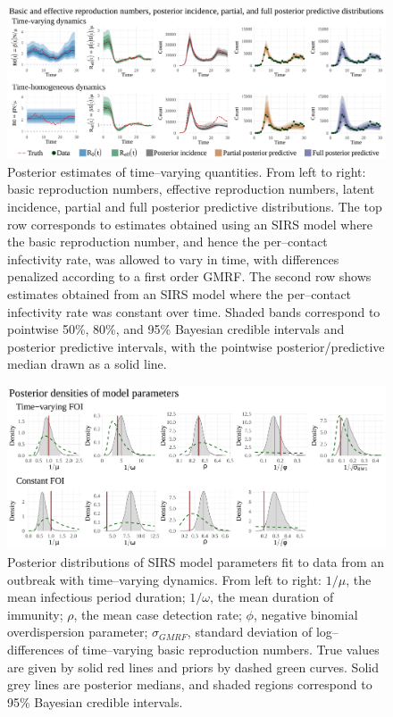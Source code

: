 \begin{figure}
	\centering
	\includegraphics[width=\linewidth]{figures/sinfoi_lna_tparam_plots}
	\caption[Time--varying reproduction numbers, latent incidence, and posterior predictive distributions for SIRS models fit to data from an outbreak with time--varying dynamics.]{Posterior estimates of time--varying quantities. From left to right: basic reproduction numbers, effective reproduction numbers, latent incidence, partial and full posterior predictive distributions. The top row corresponds to estimates obtained using an SIRS model where the basic reproduction number, and hence the per--contact infectivity rate, was allowed to vary in time, with differences penalized according to a first order GMRF. The second row shows estimates obtained from an SIRS model where the per--contact infectivity rate was constant over time. Shaded bands correspond to pointwise 50\%, 80\%, and 95\% Bayesian credible intervals and posterior predictive intervals, with the pointwise posterior/predictive median drawn as a solid line.}
	\label{fig:sinfoi_tparam_plots}
\end{figure}

\begin{figure}[htbp]
	\centering
	\includegraphics[width=\linewidth]{figures/sinfoi_lna_param_plots}
	\caption[Posterior distributions of SIRS model parameters fit to data from an outbreak with time--varying dynamics.]{Posterior distributions of SIRS model parameters fit to data from an outbreak with time--varying dynamics. From left to right: $ 1/\mu $, the mean infectious period duration; $ 1/\omega $, the mean duration of immunity; $ \rho $, the mean case detection rate; $ \phi $, negative binomial overdispersion parameter; $ \sigma_{GMRF} $, standard deviation of log--differences of time--varying basic reproduction numbers. True values are given by solid red lines and priors by dashed green curves. Solid grey lines are posterior medians, and shaded regions correspond to 95\% Bayesian credible intervals.}
	\label{fig:sinfoi_param_plots}
\end{figure}

